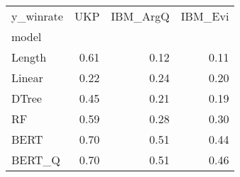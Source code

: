 \begin{tabular}{lrrr}
\toprule
y\_winrate &   UKP &  IBM\_ArgQ &  IBM\_Evi \\
model  &       &           &          \\
\midrule
Length &  0.61 &      0.12 &     0.11 \\
Linear &  0.22 &      0.24 &     0.20 \\
DTree  &  0.45 &      0.21 &     0.19 \\
RF     &  0.59 &      0.28 &     0.30 \\
BERT   &  0.70 &      0.51 &     0.44 \\
BERT\_Q &  0.70 &      0.51 &     0.46 \\
\bottomrule
\end{tabular}

